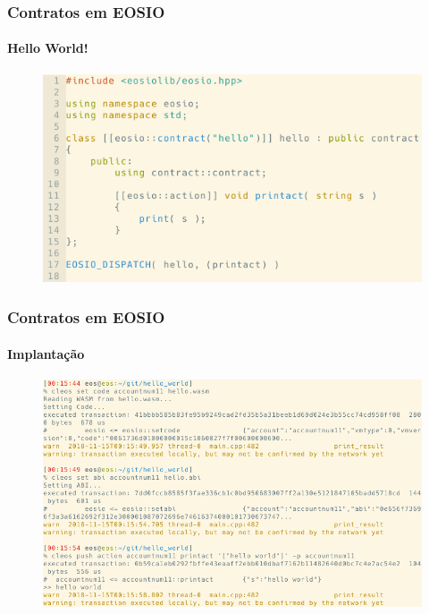 \documentclass[11pt, red]{beamer}
\begin{document}
\begin{frame}
    \frametitle{Contratos em EOSIO}
    \framesubtitle{Hello World!}
    \begin{figure}[htb]\label{ex1}
        \begin{center}
            \includegraphics[width=0.7\linewidth]{fig/contract1.png}
        \end{center}
    \end{figure}
\end{frame}

\begin{frame}
    \frametitle{Contratos em EOSIO}
    \framesubtitle{Implanta\c{c}\~ao}
    \begin{figure}[htb]\label{ex1}
        \begin{center}
            \includegraphics[width=0.9\linewidth]{fig/contract2.png}
        \end{center}
    \end{figure}
\end{frame}
\end{document}
